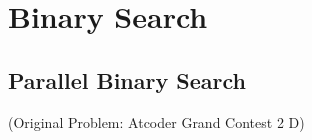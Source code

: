\section{Binary Search}
    \subsection{Parallel Binary Search}
    (Original Problem: Atcoder Grand Contest 2 D)
%     
